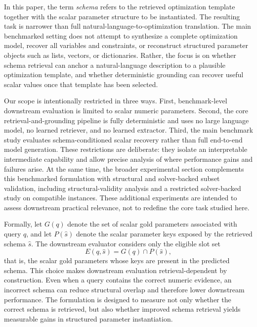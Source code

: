 \documentclass[pdflatex,sn-basic,Numbered]{sn-jnl}
\begin{document}
In this paper, the term \emph{schema} refers to the retrieved optimization template together with the scalar parameter structure to be instantiated. The resulting task is narrower than full natural-language-to-optimization translation. The main benchmarked setting does not attempt to synthesize a complete optimization model, recover all variables and constraints, or reconstruct structured parameter objects such as lists, vectors, or dictionaries. Rather, the focus is on whether schema retrieval can anchor a natural-language description to a plausible optimization template, and whether deterministic grounding can recover useful scalar values once that template has been selected.

Our scope is intentionally restricted in three ways. First, benchmark-level downstream evaluation is limited to scalar numeric parameters. Second, the core retrieval-and-grounding pipeline is fully deterministic and uses no large language model, no learned retriever, and no learned extractor. Third, the main benchmark study evaluates schema-conditioned scalar recovery rather than full end-to-end model generation. These restrictions are deliberate: they isolate an interpretable intermediate capability and allow precise analysis of where performance gains and failures arise. At the same time, the broader experimental section complements this benchmarked formulation with structural and solver-backed subset validation, including structural-validity analysis and a restricted solver-backed study on compatible instances. These additional experiments are intended to assess downstream practical relevance, not to redefine the core task studied here.

Formally, let $G(q)$ denote the set of scalar gold parameters associated with query $q$, and let $P(\hat{s})$ denote the scalar parameter keys exposed by the retrieved schema $\hat{s}$. The downstream evaluator considers only the eligible slot set
\begin{equation}
E(q,\hat{s}) = G(q) \cap P(\hat{s}),
\label{eq:eligible_slots}
\end{equation}
that is, the scalar gold parameters whose keys are present in the predicted schema. This choice makes downstream evaluation retrieval-dependent by construction. Even when a query contains the correct numeric evidence, an incorrect schema can reduce structural overlap and therefore lower downstream performance. The formulation is designed to measure not only whether the correct schema is retrieved, but also whether improved schema retrieval yields measurable gains in structured parameter instantiation.
\end{document}
